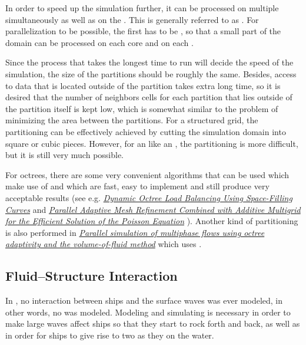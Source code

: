 In order to speed up the simulation further, it can be processed on multiple \cores simultaneously as well as on the \GPU. This is generally referred to as \parallelization. For parallelization to be possible, the  first has to be \partitioned, so that a small part of the domain can be processed on each core and on each .

Since the process that takes the longest time to run will decide the speed of the simulation, the size of the partitions should be roughly the same. Besides, access to data that is located outside of the partition takes extra long time, so it is desired that the number of neighbors cells for each partition that lies outside of the partition itself is kept low, which is somewhat similar to the problem of minimizing the area between the partitions. For a structured grid, the partitioning can be effectively achieved by cutting the simulation domain into square or cubic pieces. However, for an  like an \octree, the partitioning is more difficult, but it is still very much possible.

For octrees, there are some very convenient algorithms that can be used which make use of  and which are fast, easy to implement and still produce very acceptable results (see e.g. \textit{\href{http://j.teresco.org/research/publications/octpart02/octpart02.pdf}{Dynamic Octree Load Balancing Using Space-Filling Curves}} \citep{temp} and \textit{\href{http://downloads.isrn.com/journals/appmath/2012/246491.pdf}{Parallel Adaptive Mesh Refinement Combined with Additive Multigrid for the Efficient Solution of the Poisson Equation}} \citep{temp}). Another kind of partitioning is also performed in \textit{\href{http://gfs.sourceforge.net/papers/agbaglah2011.pdf}{Parallel simulation of multiphase flows using octree adaptivity and the volume-of-fluid method}} \citep{temp} which uses .

\subsection{Fluid--Structure Interaction}

In \thisprojectwork, no interaction between ships and the surface waves was ever modeled, in other words, no \FSI was modeled. Modeling and simulating \FSI is necessary in order to make large waves affect ships so that they start to rock forth and back, as well as in order for ships to give rise to two  as they \sail on the water.
    
